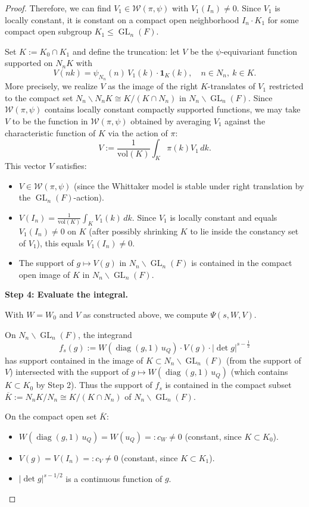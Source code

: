 \documentclass[12pt]{article}
\theoremstyle{definition}
\DeclareMathOperator{\diag}{diag}
\DeclareMathOperator{\GL}{GL}
\begin{document}
\begin{proof}
Therefore, we can find $V_1 \in \mathcal{W}(\pi, \psi)$ with $V_1(I_n) \neq 0$. Since
$V_1$ is locally constant, it is constant on a compact open neighborhood $I_n \cdot K_1$
for some compact open subgroup $K_1 \leq \GL_n(F)$.

Set $K := K_0 \cap K_1$ and define the truncation: let $V$ be the $\psi$-equivariant
function supported on $N_n K$ with
\[
  V(nk) = \psi_{N_n}(n)\, V_1(k) \cdot \mathbf{1}_{K}(k), \quad n \in N_n,\ k \in K.
\]
More precisely, we realize $V$ as the image of the right $K$-translates of $V_1$ restricted
to the compact set $N_n \backslash N_n K \cong K/(K \cap N_n)$ in $N_n \backslash \GL_n(F)$.
Since $\mathcal{W}(\pi, \psi)$ contains locally constant compactly supported functions, we
may take $V$ to be the function in $\mathcal{W}(\pi, \psi)$ obtained by averaging $V_1$
against the characteristic function of $K$ via the action of $\pi$:
\[
  V := \frac{1}{\mathrm{vol}(K)} \int_K \pi(k) V_1\, dk.
\]
This vector $V$ satisfies:
\begin{itemize}
  \item $V \in \mathcal{W}(\pi, \psi)$ (since the Whittaker model is stable under right
    translation by the $\GL_n(F)$-action).
  \item $V(I_n) = \frac{1}{\mathrm{vol}(K)} \int_K V_1(k)\, dk$. Since $V_1$ is locally
    constant and equals $V_1(I_n) \neq 0$ on $K$ (after possibly shrinking $K$ to lie
    inside the constancy set of $V_1$), this equals $V_1(I_n) \neq 0$.
  \item The support of $g \mapsto V(g)$ in $N_n \backslash \GL_n(F)$ is contained in
    the compact open image of $K$ in $N_n \backslash \GL_n(F)$.
\end{itemize}

\medskip
\noindent\textbf{Step 4: Evaluate the integral.}

With $W = W_0$ and $V$ as constructed above, we compute $\Psi(s, W, V)$.

On $N_n \backslash \GL_n(F)$, the integrand
\[
  f_s(g) := W(\diag(g,1)\,u_Q)\cdot V(g)\cdot |\det g|^{s - \frac{1}{2}}
\]
has support contained in the image of $K \subset N_n \backslash \GL_n(F)$ (from the
support of $V$) intersected with the support of $g \mapsto W(\diag(g,1)\,u_Q)$ (which
contains $K \subset K_0$ by Step 2). Thus the support of $f_s$ is contained in the
compact subset $\overline{K} := N_n K / N_n \cong K/(K \cap N_n)$ of $N_n \backslash \GL_n(F)$.

On the compact open set $\overline{K}$:
\begin{itemize}
  \item $W(\diag(g,1)\,u_Q) = W(u_Q) =: c_W \neq 0$ (constant, since $K \subset K_0$).
  \item $V(g) = V(I_n) =: c_V \neq 0$ (constant, since $K \subset K_1$).
  \item $|\det g|^{s-1/2}$ is a continuous function of $g$.
\end{itemize}


\end{proof}
\end{document}
